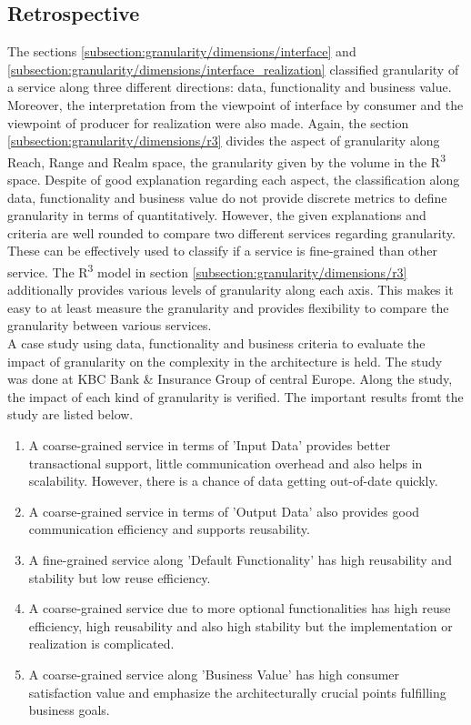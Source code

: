 \subsection{Retrospective}\label{subsection:granularity/dimensions/retrospective}
The sections \ref{subsection:granularity/dimensions/interface} and \ref{subsection:granularity/dimensions/interface_realization} classified granularity of a service along three different directions: data, functionality and business value. Moreover, the interpretation from the viewpoint of interface by consumer and the viewpoint of producer for realization were also made.
Again, the section \ref{subsection:granularity/dimensions/r3} divides the aspect of granularity along Reach, Range and Realm space, the granularity given by the volume in the R\textsuperscript{3} space.
Despite of good explanation regarding each aspect, the classification along data, functionality and business value do not provide discrete metrics to define granularity in terms of quantitatively. However, the given explanations and criteria are well rounded to compare two different services regarding granularity. These can be effectively used to classify if a service is fine-grained than other service.
The R\textsuperscript{3} model in section \ref{subsection:granularity/dimensions/r3} additionally provides various levels of granularity along each axis. This makes it easy to at least measure the granularity and provides flexibility to compare the granularity between various services.
\\
A case study \cite{Pierre-Reldin:2007aa} using data, functionality and business criteria to evaluate the impact of granularity on the complexity in the architecture is held. The study was done at KBC Bank & Insurance Group of central Europe. Along the study, the impact of each kind of granularity is verified. The important results fromt the study are listed below.

\begin{enumerate}
\item A coarse-grained service in terms of 'Input Data' provides better transactional support, little communication overhead and also helps in scalability. However, there is a chance of data getting out-of-date quickly.
\item A coarse-grained service in terms of 'Output Data' also provides good communication efficiency and supports reusability.
\item A fine-grained service along 'Default Functionality' has high reusability and stability but low reuse efficiency.
\item A coarse-grained service due to more optional functionalities has high reuse efficiency, high reusability and also high stability but the implementation or realization is complicated.
\item A coarse-grained service along 'Business Value' has high consumer satisfaction value and emphasize the architecturally crucial points fulfilling business goals.
\end{enumerate}

